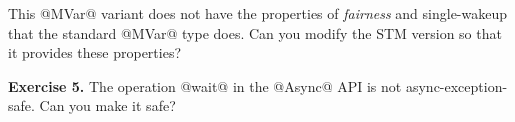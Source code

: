 \documentclass[11pt,a4paper]{article}
\begin{document}
This @MVar@ variant does not have the properties of \emph{fairness}
and {single-wakeup} that the standard @MVar@ type does.  Can you
modify the STM version so that it provides these properties?

\textbf{Exercise 5.} The operation @wait@ in the @Async@ API is not
async-exception-safe.  Can you make it safe?

\end{document}
